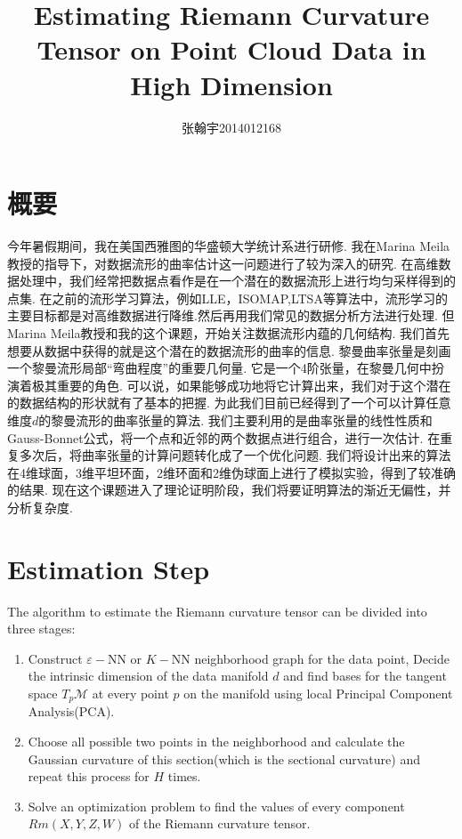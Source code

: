 \documentclass{article}
\title{Estimating Riemann Curvature Tensor on Point Cloud Data in High Dimension}
\author{张翰宇{}2014012168}
\date{}
\begin{document}
\maketitle
\section{概要}
今年暑假期间，我在美国西雅图的华盛顿大学统计系进行研修. 我在Marina Meila教授的指导下，对数据流形的曲率估计这一问题进行了较为深入的研究. 在高维数据处理中，我们经常把数据点看作是在一个潜在的数据流形上进行均匀采样得到的点集. 在之前的流形学习算法，例如LLE，ISOMAP,LTSA等算法中，流形学习的主要目标都是对高维数据进行降维.然后再用我们常见的数据分析方法进行处理. 但Marina Meila教授和我的这个课题，开始关注数据流形内蕴的几何结构. 我们首先想要从数据中获得的就是这个潜在的数据流形的曲率的信息. 
黎曼曲率张量是刻画一个黎曼流形局部“弯曲程度”的重要几何量. 它是一个4阶张量，在黎曼几何中扮演着极其重要的角色. 可以说，如果能够成功地将它计算出来，我们对于这个潜在的数据结构的形状就有了基本的把握. 为此我们目前已经得到了一个可以计算任意维度$d$的黎曼流形的曲率张量的算法. 我们主要利用的是曲率张量的线性性质和Gauss-Bonnet公式，将一个点和近邻的两个数据点进行组合，进行一次估计. 在重复多次后，将曲率张量的计算问题转化成了一个优化问题. 我们将设计出来的算法在4维球面，3维平坦环面，2维环面和2维伪球面上进行了模拟实验，得到了较准确的结果. 现在这个课题进入了理论证明阶段，我们将要证明算法的渐近无偏性，并分析复杂度.
\section{Estimation Step}
The algorithm to estimate the Riemann curvature tensor can be divided into three stages:
\begin{enumerate}
	\item Construct $\varepsilon-$NN or $K-$NN neighborhood graph for the data point, Decide the intrinsic dimension of the data manifold $d$ and find bases for the tangent space $T_p\mathcal{M}$ at every point $p$ on the manifold using local Principal Component Analysis(PCA). 
	\item Choose all possible two points in the neighborhood and calculate the Gaussian curvature of this section(which is the sectional curvature) and repeat this process for $H$ times.
	\item Solve an optimization problem to find the values of every component $Rm(X,Y,Z,W)$ of the Riemann curvature tensor.
\end{enumerate}
\end{document}
